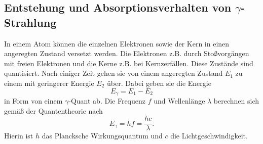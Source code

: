 \subsection{\texorpdfstring{Entstehung und Absorptionsverhalten von $\gamma$-Strahlung}{}}
In einem Atom können die einzelnen Elektronen sowie der Kern in einen angeregten Zustand versetzt werden. Die Elektronen z.B. durch Stoßvorgängen mit freien Elektronen und die Kerne z.B. bei Kernzerfällen. Diese Zustände sind quantisiert. Nach einiger Zeit gehen sie von einem angeregten Zustand $E_1$ zu einem mit geringerer Energie $E_2$ über. Dabei geben sie die Energie 
\begin{equation}
	E_\gamma=E_1-E_2
\end{equation}
in Form von einem $\gamma$-Quant ab. Die Frequenz $f$ und Wellenlänge $\lambda$ berechnen sich gemäß der Quantentheorie nach
\begin{equation}
	E_\gamma = h f = \frac{h c}{\lambda} \text{.}
\end{equation}
Hierin ist $h$ das Plancksche Wirkungsquantum und $c$ die Lichtgeschwindigkeit. 

